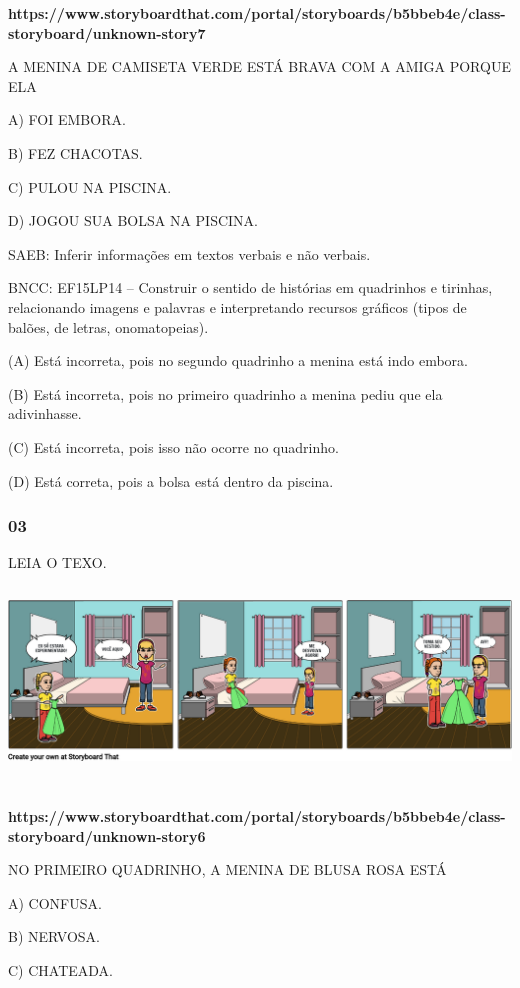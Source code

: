 \textbf{https://www.storyboardthat.com/portal/storyboards/b5bbeb4e/class-storyboard/unknown-story7}

A MENINA DE CAMISETA VERDE ESTÁ BRAVA COM A AMIGA PORQUE ELA

A) FOI EMBORA.

B) FEZ CHACOTAS.

C) PULOU NA PISCINA.

D) JOGOU SUA BOLSA NA PISCINA.

SAEB: Inferir informações em textos verbais e não verbais.

BNCC: EF15LP14 -- Construir o sentido de histórias em
quadrinhos e tirinhas, relacionando imagens e palavras e interpretando
recursos gráficos (tipos de balões, de letras, onomatopeias).

(A) Está incorreta, pois no segundo quadrinho a menina está indo embora.

(B) Está incorreta, pois no primeiro quadrinho a menina pediu que ela
adivinhasse.

(C) Está incorreta, pois isso não ocorre no quadrinho.

(D) Está correta, pois a bolsa está dentro da
piscina.\protect\hypertarget{_heading=h.tt4s01xrdwwn}{}{}

\subsubsection{03 }\label{section-25}

LEIA O
TEXO.\includegraphics[width=6.07986in,height=2.24583in]{media/image182.png}

\textbf{https://www.storyboardthat.com/portal/storyboards/b5bbeb4e/class-storyboard/unknown-story6}

NO PRIMEIRO QUADRINHO, A MENINA DE BLUSA ROSA ESTÁ

A) CONFUSA.

B) NERVOSA.

C) CHATEADA.

